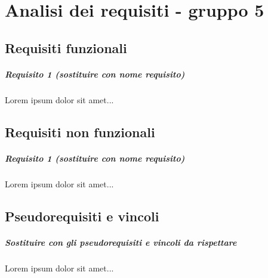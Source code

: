 
\chapter{Analisi dei requisiti - gruppo 5}
\label{ref:requisiti5}


\section{Requisiti funzionali}

\paragraph{Requisito 1 (sostituire con nome requisito) \\} 
Lorem ipsum dolor sit amet...

\section{Requisiti non funzionali}

\paragraph{Requisito 1 (sostituire con nome requisito) \\} 
Lorem ipsum dolor sit amet...

\section{Pseudorequisiti e vincoli}
\paragraph{Sostituire con gli pseudorequisiti e vincoli da rispettare \\}
Lorem ipsum dolor sit amet...

\newpage